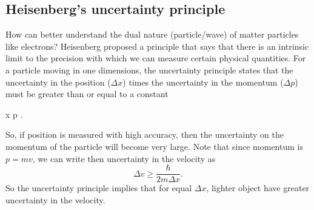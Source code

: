 \subsection{Heisenberg's uncertainty principle}
How can better understand the dual nature (particle/wave) of matter particles like electrons?
Heisenberg proposed a principle that says that there is an intrinsic limit to the precision with which we can measure certain physical quantities.
For a particle moving in one dimensions, the uncertainty principle states that the uncertainty in the position ($\Delta x$) times the uncertainty in the momentum ($\Delta p$) must be greater than or equal to a constant
\begin{iequation}
\Delta x \Delta p \geq {}.
\end{iequation}
So, if position is measured with high accuracy, then the uncertainty on the momentum of the particle will become very large.
Note that since momentum is $p = mv$, we can write then uncertainty in the velocity as
\begin{equation}
\Delta v \geq \frac{\hbar}{2 m \Delta x }.
\end{equation}
So the uncertainty principle implies that for equal $\Delta x$, lighter object have greater uncertainty in the velocity.
